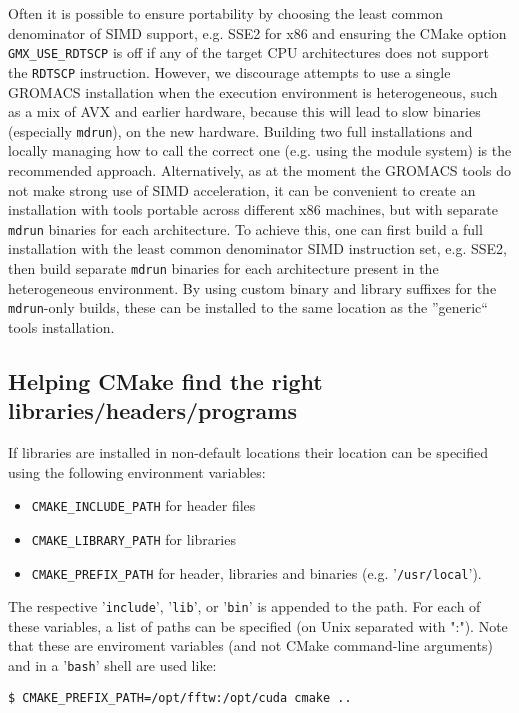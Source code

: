 \documentclass{article}[12pt,a4paper,twoside]
\newcommand{\gromacs}{GROMACS}
\newcommand{\cmake}{CMake}
\newcommand{\avx}{AVX}
\begin{document}
Often it is possible to ensure portability by choosing the
least common denominator of SIMD support, e.g. SSE2 for x86
and ensuring the \cmake{} option \verb+GMX_USE_RDTSCP+ is off if any of the
target CPU architectures does not support the \verb+RDTSCP+ instruction.
However, we discourage attempts to use a single \gromacs{}
installation when the execution environment is heterogeneous, such as
a mix of \avx{} and earlier hardware, because this will lead to slow
binaries (especially \verb+mdrun+), on the new hardware.
Building two full installations and locally managing how to
call the correct one (e.g. using the module system) is the recommended
approach.
Alternatively, as at the moment the \gromacs{} tools do not make
strong use of SIMD acceleration, it can be convenient to create an installation
with tools portable across different x86 machines, but with separate \verb+mdrun+
binaries for each architecture.
To achieve this, one can first build a full installation with the least common
denominator SIMD instruction set, e.g. SSE2, then build separate \verb+mdrun+
binaries for each architecture present in the heterogeneous environment.
By using custom binary and library suffixes for the \verb+mdrun+-only builds,
these can be installed to the same location as the ''generic`` tools installation.


\subsection{Helping CMake find the right libraries/headers/programs}

If libraries are installed in non-default locations their location can
be specified using the following environment variables:
\begin{itemize}
\item \verb+CMAKE_INCLUDE_PATH+ for header files
\item \verb+CMAKE_LIBRARY_PATH+ for libraries
\item \verb+CMAKE_PREFIX_PATH+ for header, libraries and binaries
  (e.g. '\verb+/usr/local+').
\end{itemize}
The respective '\verb+include+', '\verb+lib+', or '\verb+bin+' is
appended to the path. For each of these variables, a list of paths can
be specified (on Unix separated with ":"). Note that these are
enviroment variables (and not \cmake{} command-line arguments) and in
a '\verb+bash+' shell are used like:
\begin{verbatim}
$ CMAKE_PREFIX_PATH=/opt/fftw:/opt/cuda cmake ..
\end{verbatim}
\end{document}
